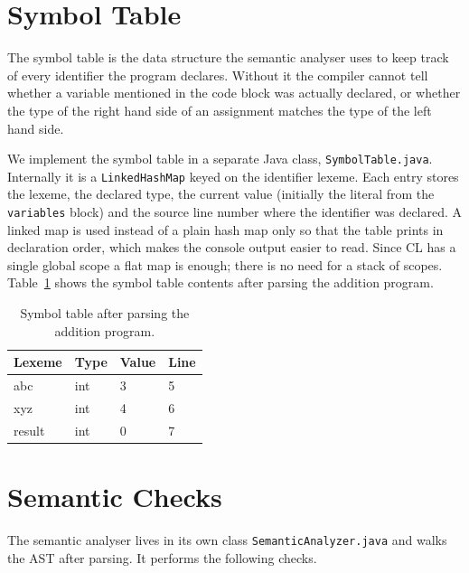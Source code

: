 \documentclass[12pt,a4paper]{report}
\begin{document}
\section{Symbol Table}

The symbol table is the data structure the semantic analyser uses to keep track of every identifier the program declares. Without it the compiler cannot tell whether a variable mentioned in the code block was actually declared, or whether the type of the right hand side of an assignment matches the type of the left hand side.

We implement the symbol table in a separate Java class, \texttt{SymbolTable.java}. Internally it is a \texttt{LinkedHashMap} keyed on the identifier lexeme. Each entry stores the lexeme, the declared type, the current value (initially the literal from the \texttt{variables} block) and the source line number where the identifier was declared. A linked map is used instead of a plain hash map only so that the table prints in declaration order, which makes the console output easier to read. Since CL has a single global scope a flat map is enough; there is no need for a stack of scopes. Table~\ref{tab:symtab} shows the symbol table contents after parsing the addition program.

\begin{table}[H]
\centering
\begin{tabular}{|l|l|l|l|}
\hline
\textbf{Lexeme} & \textbf{Type} & \textbf{Value} & \textbf{Line} \\
\hline
abc & int & 3 & 5 \\
xyz & int & 4 & 6 \\
result & int & 0 & 7 \\
\hline
\end{tabular}
\caption{Symbol table after parsing the addition program.}
\label{tab:symtab}
\end{table}

\section{Semantic Checks}

The semantic analyser lives in its own class \texttt{SemanticAnalyzer.java} and walks the AST after parsing. It performs the following checks.
\end{document}
